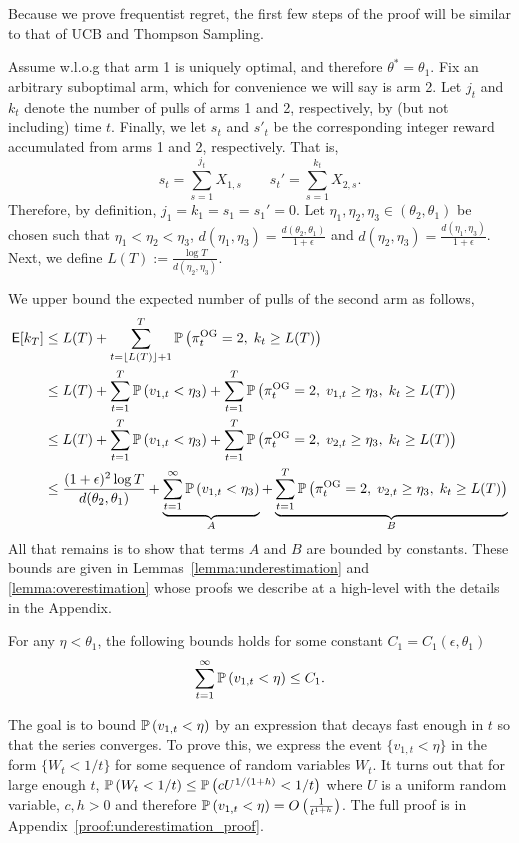 \begin{myproof}[Proof.]
	Because we prove frequentist regret, the first few steps of the proof will be similar to that of UCB and Thompson Sampling.
	
	Assume w.l.o.g that arm 1 is uniquely optimal, and therefore $\theta^* = \theta_1$. Fix an arbitrary suboptimal arm, which for convenience we will say is arm 2. Let $j_t$ and $k_t$ denote the number of pulls of arms 1 and 2, respectively, by (but not including) time $t$. Finally, we let $s_t$ and $s'_t$ be the corresponding integer reward accumulated from arms 1 and 2, respectively. That is,
	\[
	s_t = \sum_{s=1}^{j_t} X_{1,s}  \qquad s_t' = \sum_{s=1}^{k_t} X_{2,s}.
	\]
	Therefore, by definition, $j_1 = k_1 = s_1 = s_1' = 0$. Let $\eta_1,\eta_2,\eta_3 \in (\theta_2, \theta_1)$ be chosen such that $\eta_1 < \eta_2 < \eta_3$, $d(\eta_1, \eta_3) = \frac{d(\theta_2, \theta_1)}{1+\epsilon}$ and $d(\eta_2,\eta_3) =\frac{d(\eta_1, \eta_3)}{1+\epsilon} $. Next, we define $L(T) := \frac{\log T}{d(\eta_2,\eta_3)}$.
	
	We upper bound the expected number of pulls of the second arm as follows,
	\begin{align}
	\E[k_T] & \le L(T) + \sum_{t=\floor{L(T)}+1}^T \P{\pi^{\rm OG}_t = 2, \; k_t \ge L(T)} \nonumber \\
	& \le L(T) +   \sum_{t=1}^T \P{v_{1,t} < \eta_3} + \sum_{t=1}^T \P{\pi^{\rm OG}_t = 2,\; v_{1,t} \ge \eta_3, \; k_t \ge L(T)} \nonumber \\
	& \le L(T) +   \sum_{t=1}^T \P{v_{1,t} < \eta_3} + \sum_{t=1}^T \P{\pi^{\rm OG}_t = 2,\; v_{2,t} \ge \eta_3, \; k_t \ge L(T)} \nonumber \\
	& \le \frac{(1+\epsilon)^2 \log T}{d(\theta_2, \theta_1)} + \underbrace{\sum_{t=1}^\infty \P{v_{1,t} < \eta_3}}_{A} + \underbrace{\sum_{t=1}^T \P{\pi^{\rm OG}_t = 2,\;v_{2,t} \ge \eta_3, \; k_t \ge L(T)}}_{B} \label{bound:final_step_in_freq_regret}
	\end{align}
	All that remains is to show that terms $A$ and $B$ are bounded by constants. These bounds are given in Lemmas~\ref{lemma:underestimation} and \ref{lemma:overestimation} whose proofs we describe at a high-level with the details in the Appendix.
	\begin{lemma} \label{lemma:underestimation}
		For any $\eta < \theta_1$, the following bounds holds for some constant $C_1 = C_1(\epsilon, \theta_1)$
		\begin{equation*}
		\sum_{t=1}^\infty \P{v_{1,t} < \eta} \le C_1.
		\end{equation*}
	\end{lemma}
	\begin{myproof}
		The goal is to bound $\P{v_{1,t} < \eta}$ by an expression that decays fast enough in $t$ so that the series converges. To prove this, we express the event $\{v_{1,t} < \eta\}$ in the form $\{W_t < 1/t\}$ for some sequence of random variables $W_t$. It  turns out that for large enough $t$, $\P{W_t < 1/t} \le \P{c U^{1/(1+h)} < 1/t}$ where $U$ is a uniform random variable, $c, h > 0$ and therefore $\P{v_{1,t} < \eta} = O\left(\frac{1}{t^{1+h}}\right)$. The full proof is in Appendix~\ref{proof:underestimation_proof}.
		

\end{myproof}
\end{myproof}
